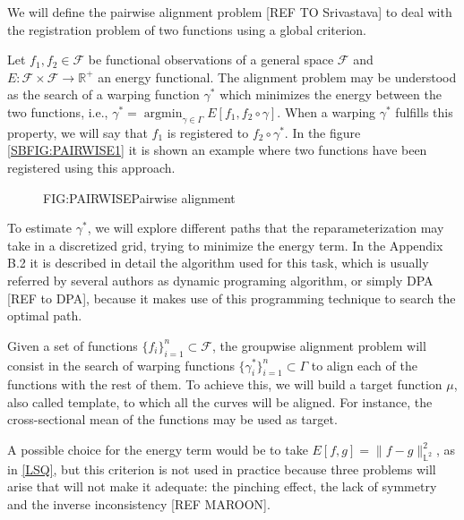 
We will define the pairwise alignment problem [REF TO Srivastava] to deal with
the registration problem of two functions using a global criterion.

Let $f_1, f_2 \in \mathcal{F}$ be functional observations of a general space
$\mathcal{F}$ and $E: \mathcal{F} \times \mathcal{F} \rightarrow \mathbb{R}^+$ an energy
functional. The alignment problem may be understood as the search of a warping
function $\gamma^*$ which minimizes the energy between the two functions, i.e.,
$\gamma^* = \operatorname{argmin}_{\gamma \in \Gamma} E[f_1, f_2 \circ \gamma]$.
When a warping $\gamma^*$ fulfills this property, we will say that $f_1$ is
registered to $f_2 \circ \gamma^*$. In the figure \ref{SBFIG:PAIRWISE1} it is
shown an example where two functions have been registered using this approach.

\begin{figure}[Pairwise alignment]{FIG:PAIRWISE}{Pairwise alignment}
	 \quad
\end{figure}

To estimate $\gamma^*$, we will explore different paths that the
reparameterization may take in a discretized grid, trying to minimize the energy
term. In the Appendix B.2 it is described in detail the algorithm used for this
task, which is usually referred by several authors as dynamic programing
algorithm, or simply DPA [REF to DPA], because it makes use of this programming
technique to search the optimal path.



Given a set of functions $\{f_i\}_{i=1}^n \subset \mathcal{F}$, the
groupwise alignment problem will consist in the search of warping functions
$\{\gamma_i^* \}_{i=1}^n \subset \Gamma$ to align each of the functions with the
rest of them. To achieve this, we will build a target function $\mu$, also
called template, to which all the curves will be aligned. For instance,
the cross-sectional mean of the functions may be used as target.

A possible choice for the energy term would be to take
$E[f,g]= \|f - g\|_{\mathbb{L}^2}^2$, as in \ref{LSQ}, but
this criterion is not used in practice because three
problems will arise that will not make it adequate: the pinching effect, the
lack of symmetry and the inverse inconsistency [REF MAROON].

